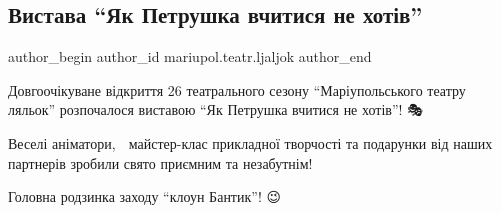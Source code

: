  
 
 
 
 

\subsection{Вистава \enquote{Як Петрушка вчитися не хотів}}
\label{sec:17_10_2021.fb.mariupol.teatr.ljaljok.1.vystava_jak_petrushka_vchytysja_ne_hotiv}

\ifcmt
 author_begin
   author_id mariupol.teatr.ljaljok
 author_end
\fi

Довгоочікуване відкриття 26 театрального сезону \enquote{Маріупольського театру ляльок}
розпочалося виставою \enquote{Як Петрушка вчитися не хотів}! 🎭

Веселі аніматори, 🥳 майстер-клас прикладної творчості та подарунки від наших
партнерів зробили свято приємним та незабутнім! 🎊🎁🤩

Головна родзинка заходу \enquote{клоун Бантик}! 😉
